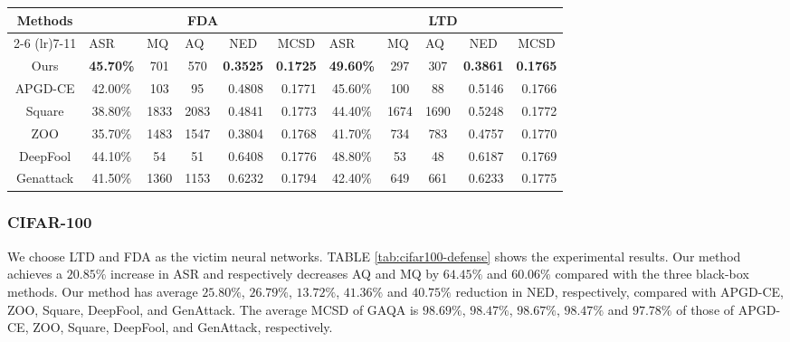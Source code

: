 \documentclass[lettersize,journal]{IEEEtran}
\begin{document}
	
	
	\begin{table*}[t]
		\centering
		\caption{Attack comparison of defensive models on CIFAR-100}
		\begin{tabular}{ccccrrcccrr}
			\toprule
			\multirow{2}[4]{*}{Methods} & \multicolumn{5}{c}{FDA \cite{rebuffi2021fixing}} & \multicolumn{5}{c}{LTD \cite{chen2021ltd}} \\
			\cmidrule(lr){2-6}  \cmidrule(lr){7-11}        & \multicolumn{1}{l}{ASR} & \multicolumn{1}{l}{  MQ} & \multicolumn{1}{l}{AQ} & \multicolumn{1}{c}{NED} & \multicolumn{1}{c}{MCSD} & \multicolumn{1}{l}{ASR} & \multicolumn{1}{l}{MQ} & \multicolumn{1}{l}{AQ} & \multicolumn{1}{c}{NED} & \multicolumn{1}{c}{MCSD} \\
			\midrule
			Ours  & \textbf{45.70\%} & 701   & 570   & \textbf{0.3525} & \textbf{0.1725} & \textbf{49.60\%} & 297   & 307   & \textbf{0.3861} & \textbf{0.1765} \\
			APGD-CE & 42.00\% & 103   & 95    & 0.4808  & 0.1771  & 45.60\% & 100   & 88    & 0.5146  & 0.1766  \\
			Square & 38.80\% & 1833  & 2083  & 0.4841  & 0.1773  & 44.40\% & 1674  & 1690  & 0.5248  & 0.1772  \\
			ZOO   & 35.70\% & 1483  & 1547  & 0.3804  & 0.1768  & 41.70\% & 734   & 783   & 0.4757  & 0.1770  \\
			DeepFool & 44.10\% & 54    & 51    & 0.6408  & 0.1776  & 48.80\% & 53    & 48    & 0.6187  & 0.1769  \\
			Genattack & 41.50\% & 1360  & 1153  & 0.6232  & 0.1794  & 42.40\% & 649   & 661   & 0.6233  & 0.1775  \\
			\bottomrule
		\end{tabular}%
		\label{tab:cifar100-defense}%
	\end{table*}%
	
	\subsubsection{CIFAR-100}
	We choose LTD \cite{chen2021ltd} and FDA \cite{rebuffi2021fixing} as the victim neural networks. TABLE \ref{tab:cifar100-defense} shows the experimental results.
	Our method achieves a $20.85\%$ increase in ASR and respectively decreases AQ and MQ by $64.45\%$ and $60.06\%$ compared with the three black-box methods. 
	Our method has average $25.80\%$, $26.79\%$, $13.72\%$, $41.36\%$ and $40.75\%$ reduction in NED, respectively, compared with APGD-CE, ZOO, Square, DeepFool, and GenAttack. The average MCSD of GAQA is  $98.69\%$, $98.47\%$, $98.67\%$, $98.47\%$ and $97.78\%$ of those of APGD-CE, ZOO, Square, DeepFool, and GenAttack, respectively. 
	
\end{document}
